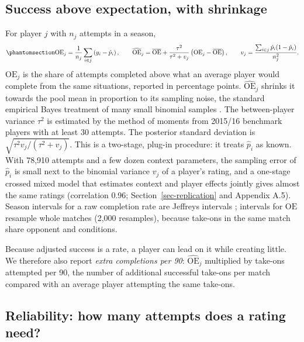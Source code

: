 \documentclass[
  12pt]{article}
\begin{document}
\subsection{Success above expectation, with
shrinkage}\label{success-above-expectation-with-shrinkage}

For player \(j\) with \(n_j\) attempts in a season,
\begin{equation}\protect\phantomsection\label{eq-oe}{\mathrm{OE}_j = \frac{1}{n_j}\sum_{i\in j}\left(y_i-\hat p_i\right),\qquad
\widehat{\mathrm{OE}}_j = \overline{\mathrm{OE}} + \frac{\tau^2}{\tau^2+v_j}\left(\mathrm{OE}_j-\overline{\mathrm{OE}}\right),\qquad v_j=\frac{\sum_{i\in j}\hat p_i(1-\hat p_i)}{n_j^2}.}\end{equation}
\(\mathrm{OE}_j\) is the share of attempts completed above what an
average player would complete from the same situations, reported in
percentage points. \(\widehat{\mathrm{OE}}_j\) shrinks it towards the
pool mean in proportion to its sampling noise, the standard empirical
Bayes treatment of many small binomial samples
\citep{efron1975, morris1983, brown2008}. The between-player variance
\(\tau^2\) is estimated by the method of moments from 2015/16 benchmark
players with at least 30 attempts. The posterior standard deviation is
\(\sqrt{\tau^2 v_j/(\tau^2+v_j)}\). This is a two-stage, plug-in
procedure: it treats \(\hat p_i\) as known. With 78,910 attempts and a
few dozen context parameters, the sampling error of \(\hat p_i\) is
small next to the binomial variance \(v_j\) of a player's rating, and a
one-stage crossed mixed model that estimates context and player effects
jointly gives almost the same ratings (correlation 0.96;
Section~\ref{sec-replication} and Appendix A.5). Season intervals for a
raw completion rate are Jeffreys intervals \citep{brown2001}; intervals
for \(\mathrm{OE}\) resample whole matches (2,000 resamples), because
take-ons in the same match share opponent and conditions.

Because adjusted success is a rate, a player can lead on it while
creating little. We therefore also report \emph{extra completions per
90}: \(\widehat{\mathrm{OE}}_j\) multiplied by take-ons attempted per
90, the number of additional successful take-ons per match compared with
an average player attempting the same take-ons.

\subsection{Reliability: how many attempts does a rating
need?}\label{sec-rel-method}
\end{document}
